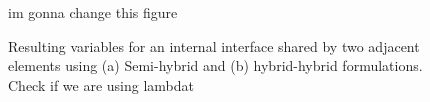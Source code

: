 \documentclass[english,11pt,3p,number,sort&compress]{elsarticle}
\newcommand{\giovane}{\color{red}{\bf\Large GA} \color{cyan} }
\newcommand{\nathan}{\color{red}{\bf\Large NS} \color{cyan} }
\begin{document}
\begin{figure}[htb!]
    \centering 
	\hspace{2cm}
    \hfill
	\caption{Resulting variables for an internal interface shared by two adjacent elements using (a) Semi-hybrid and (b) hybrid-hybrid formulations. {\nathan Check if we are using lambdat}} {\giovane im gonna change this figure}
	\label{fig:hybrid-variables}
\end{figure}
\end{document}
